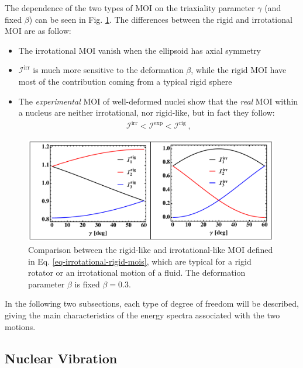 The dependence of the two types of MOI on the triaxiality parameter $\gamma$ (and fixed $\beta$) can be seen in Fig. \ref{fig-irrotational-rigid-mois}. The differences between the rigid and irrotational MOI are as follow:
\begin{itemize}
    \item The irrotational MOI vanish when the ellipsoid has axial symmetry
    \item $\mathcal{I}^\text{irr}$ is much more sensitive to the deformation $\beta$, while the rigid MOI have most of the contribution coming from a typical rigid sphere
    \item The \emph{experimental} MOI of well-deformed nuclei show that the \emph{real} MOI within a nucleus are neither irrotational, nor rigid-like, but in fact they follow:
    \begin{align}
        \mathcal{I}^\text{irr}<\mathcal{I}^\text{exp}<\mathcal{I}^\text{rig}\ ,
        \label{experimental-MOI-vs-rig-irr}
    \end{align}
\end{itemize}
\begin{figure}
    \centering
    \includegraphics[width=0.99\textwidth]{Chapters/Figures/mois_rig_irr.pdf}
    \caption{Comparison between the rigid-like and irrotational-like MOI defined in Eq. \eqref{eq-irrotational-rigid-mois}, which are typical for a rigid rotator or an irrotational motion of a fluid. The deformation parameter $\beta$ is fixed $\beta=0.3$.}
    \label{fig-irrotational-rigid-mois}
\end{figure}

In the following two subsections, each type of degree of freedom will be described, giving the main characteristics of the energy spectra associated with the two motions. 

\subsection{Nuclear Vibration}
\label{subsection-nuclear-vibration}

